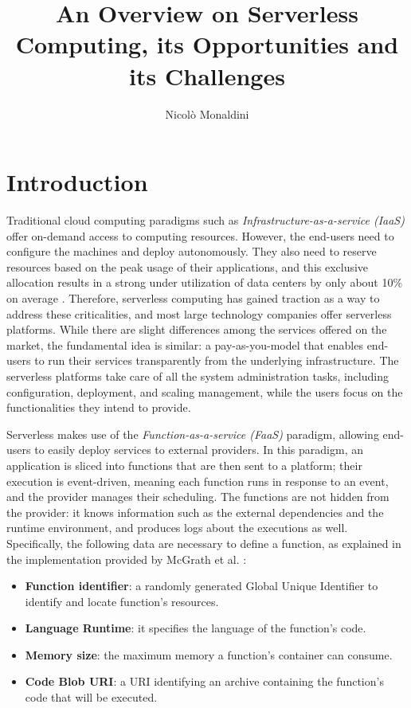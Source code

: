 \documentclass[
	a4paper, %
	12pt,
	twoside, %
]{LTJournalArticle}
\title{An Overview on Serverless Computing, its Opportunities and its Challenges} %
\author{%
	Nicolò Monaldini
}
\begin{document}
\maketitle %


\section{Introduction}
\label{sec:introduction}

Traditional cloud computing paradigms such as \textit{Infrastructure-as-a-service (IaaS)} offer on-demand access to computing resources. However, the end-users need to configure the machines and deploy autonomously. They also need to reserve resources based on the peak usage of their applications, and this exclusive allocation results in a strong under utilization of data centers by only about 10\% on average \cite{li_serverless_2022}. Therefore, serverless computing has gained traction as a way to address these criticalities, and most large technology companies offer serverless platforms. While there are slight differences among the services offered on the market, the fundamental idea is similar: a pay-as-you-model that enables end-users to run their services transparently from the underlying infrastructure. The serverless platforms take care of all the system administration tasks, including configuration, deployment, and scaling management, while the users focus on the functionalities they intend to provide.

Serverless makes use of the \textit{Function-as-a-service (FaaS)} paradigm, allowing end-users to easily deploy services to external providers. In this paradigm, an application is sliced into functions that are then sent to a platform; their execution is event-driven, meaning each function runs in response to an event, and the provider manages their scheduling. The functions are not hidden from the provider: it knows information such as the external dependencies and the runtime environment, and produces logs about the executions as well. Specifically, the following data are necessary to define a function, as explained in the implementation provided by McGrath et al. \cite{mcgrath_serverless_2017}:

\begin{itemize}
	\item \textbf{Function identifier}: a randomly generated Global Unique Identifier to identify and locate function's resources.
	\item \textbf{Language Runtime}: it specifies the language of the function's code.
	\item \textbf{Memory size}: the maximum memory a function's container can consume.
	\item \textbf{Code Blob URI}: a URI identifying an archive containing the function's code that will be executed.
\end{itemize}
\end{document}
